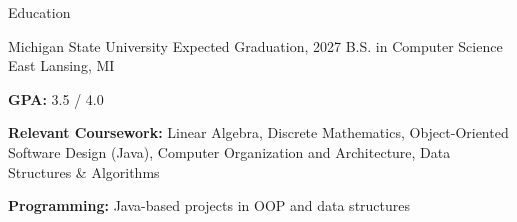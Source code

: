 \documentclass[
	11pt
]{../../../resume}
\begin{document}
	\begin{rSection}{E}{ducation}
		\begin{rSectionEntry}
			{Michigan State University}
			{Expected Graduation, 2027}
			{B.S. in Computer Science}
			{}
			{East Lansing, MI}

			\item \textbf{GPA:} 3.5 / 4.0
			\item \textbf{Relevant Coursework:} Linear Algebra, Discrete Mathematics, Object-Oriented Software Design (Java), Computer Organization and Architecture, Data Structures \& Algorithms
			\item \textbf{Programming:} Java-based projects in OOP and data structures
		\end{rSectionEntry}
	\end{rSection}
\end{document}
